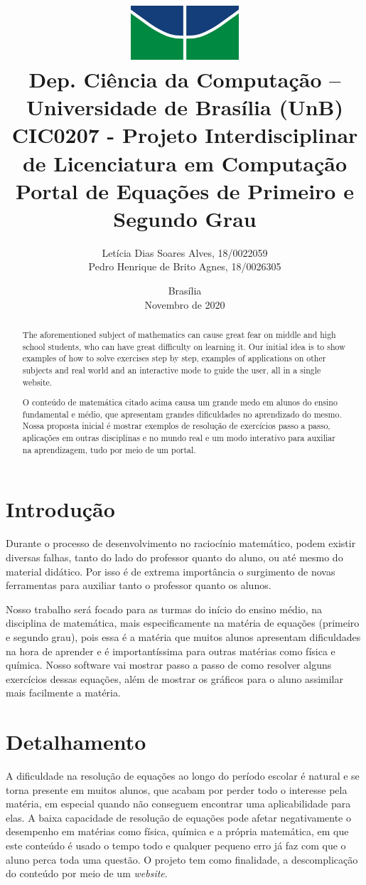 \documentclass[12pt]{report}
\title{\includegraphics[width=4cm]{logo.jpg} \\ 
    \large{Dep. Ciência da Computação -- Universidade de Brasília (UnB)\\
        CIC0207 - Projeto Interdisciplinar de Licenciatura em Computação} \\
        \vfill 
        \vfill
        \LARGE
    \textbf{Portal de Equações de Primeiro e Segundo Grau}}
\author{Letícia Dias Soares Alves, 18/0022059\\
        Pedro Henrique de Brito Agnes, 18/0026305
    }
\affil{\vfill
        \vfill
        \vfill
        Professora \\
        Dr.a Letícia Lopes Leite
    }
\date{Brasília\\Novembro de 2020}
\begin{document}
\maketitle

\begin{abstract}
  The aforementioned subject of mathematics can cause great fear on middle and high school students, who can have great difficulty on learning it. Our initial idea is to show examples of how to solve exercises step by step, examples of applications on other subjects and real world and an interactive mode to guide the user, all in a single website.
\end{abstract}

\begin{abstract}
  O conteúdo de matemática citado acima causa um grande medo em alunos do ensino fundamental e médio, que apresentam grandes dificuldades no aprendizado do mesmo. Nossa proposta inicial é mostrar exemplos de resolução de exercícios passo a passo, aplicações em outras disciplinas e no mundo real e um modo interativo para auxiliar na aprendizagem, tudo por meio de um portal.
\end{abstract}

\tableofcontents
\newpage

\section{Introdução}
Durante o processo de desenvolvimento no raciocínio matemático, podem existir diversas falhas, tanto do lado do professor quanto do aluno, ou até mesmo do material didático. Por isso é de extrema importância o surgimento de novas ferramentas para auxiliar tanto o professor quanto os alunos.

Nosso trabalho será focado para as turmas do início do ensino médio, na disciplina de matemática, mais especificamente na matéria de equações (primeiro e segundo grau), pois essa é a matéria que muitos alunos apresentam dificuldades na hora de aprender e é importantíssima para outras matérias como física e química. Nosso software vai mostrar passo a passo de como resolver alguns exercícios dessas equações, além de mostrar os gráficos para o aluno assimilar mais facilmente a matéria.

\section{Detalhamento}
A dificuldade na resolução de equações ao longo do período escolar é natural e se torna presente em muitos alunos, que acabam por perder todo o interesse pela matéria, em especial quando não conseguem encontrar uma aplicabilidade para elas. A baixa capacidade de resolução de equações pode afetar negativamente o desempenho em matérias como física, química e a própria matemática, em que este conteúdo é usado o tempo todo e qualquer pequeno erro já faz com que o aluno perca toda uma questão. O projeto tem como finalidade, a descomplicação do conteúdo por meio de um \textit{website}.
\end{document}
